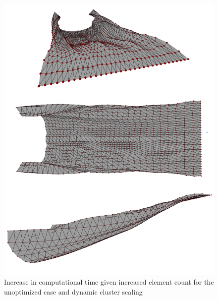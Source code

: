 \begin{figure}[H]
\centering
\includegraphics[width=1.0\textwidth]{Figures/HorseShoeVortexSheet.png}
\caption{\label{fig:DynamicClusterTimes} Increase in computational time given increased element count for the unoptimized case and dynamic cluster scaling}
\end{figure} 

